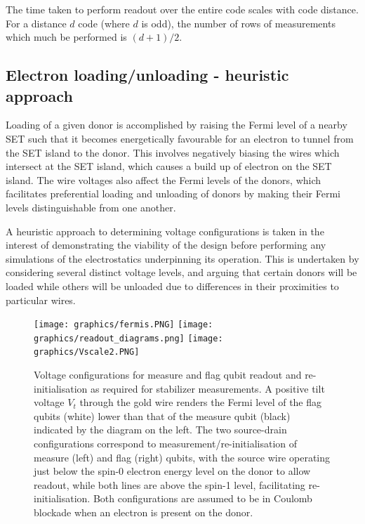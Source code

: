 \documentclass[../Thesis.tex]{subfiles}
\begin{document}
The time taken to perform readout over the entire code scales with code distance. For a distance $d$ code (where $d$ is odd), the number of rows of measurements which much be performed is $(d+1)/2$.




\subsection{Electron loading/unloading - heuristic approach}
Loading of a given donor is accomplished by raising the Fermi level of a nearby SET such that it becomes energetically favourable for an electron to tunnel from the SET island to the donor. This involves negatively biasing the wires which intersect at the SET island, which causes a build up of electron on the SET island. The wire voltages also affect the Fermi levels of the donors, which facilitates preferential loading and unloading of donors by making their Fermi levels distinguishable from one another.

A heuristic approach to determining voltage configurations is taken in the interest of demonstrating the viability of the design before performing any simulations of the electrostatics underpinning its operation. This is undertaken by considering several distinct voltage levels, and arguing that certain donors will be loaded while others will be unloaded due to differences in their proximities to particular wires.

\begin{figure}
    \centering
    \texttt{[image: graphics/fermis.PNG]}\hspace{15pt}
    \texttt{[image: graphics/readout\_diagrams.png]}\hspace{10pt}
    \texttt{[image: graphics/Vscale2.PNG]} 
    \caption{Voltage configurations for measure and flag qubit readout and re-initialisation as required for stabilizer measurements. A positive tilt voltage $V_{t}$ through the gold wire renders the Fermi level of the flag qubits (white) lower than that of the measure qubit (black) indicated by the diagram on the left. The two source-drain configurations correspond to measurement/re-initialisation of measure (left) and flag (right) qubits, with the source wire operating just below the spin-0 electron energy level on the donor to allow readout, while both lines are above the spin-1 level, facilitating re-initialisation. Both configurations are assumed to be in Coulomb blockade when an electron is present on the donor.}
    \label{fig:fermis}
\end{figure}
\end{document}
